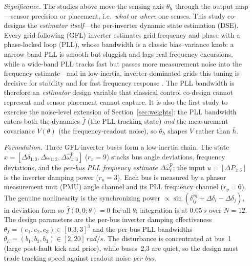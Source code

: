 \documentclass[twocolumn,amsthm]{autart}
\begin{document}
\emph{Significance.} The studies above move the sensing axis $\theta_h$ through
the output map---sensor precision or placement, i.e.\ \emph{what} or \emph{where}
one senses. This study co-designs the \emph{estimator itself}---the per-inverter
dynamic state estimation (DSE). Every
grid-following (GFL) inverter estimates grid frequency and phase with a
phase-locked loop (PLL), whose bandwidth is a classic bias--variance knob: a
narrow-band PLL is smooth but sluggish and lags real frequency excursions, while
a wide-band PLL tracks fast but passes more measurement noise into the frequency
estimate---and in low-inertia, inverter-dominated grids this tuning is decisive
for stability and for fast frequency response \cite{zhao2019power}. The PLL
bandwidth is therefore an \emph{estimator} design variable that classical control
co-design cannot represent and sensor placement cannot capture. It is also the
first study to exercise the noise-level extension of
Section~\ref{sec:weights}: the PLL bandwidth enters both the dynamics
$\bar f$ (the PLL tracking state) \emph{and} the measurement covariance
$V(\theta)$ (the frequency-readout noise), so $\theta_h$ shapes $V$ rather than
$\bar h$.

\emph{Formulation.} Three GFL-inverter buses form a low-inertia chain. The state
$x=[\Delta\delta_{1:3},\Delta\omega_{1:3},\Delta\hat\omega^{\mathrm p}_{1:3}]$
($r_x=9$) stacks bus angle deviations, frequency deviations, and the
\emph{per-bus PLL frequency estimate} $\Delta\hat\omega^{\mathrm p}_i$; the input
$u=[\Delta P_{1:3}]$ is the inverter damping power ($r_u=3$). Each bus is measured
by a phasor measurement unit (PMU) angle channel and its PLL frequency channel
($r_y=6$). The genuine
nonlinearity is the synchronizing power $\propto\sin(\delta^{\mathrm{eq}}_{ij}+
\Delta\delta_i-\Delta\delta_j)$, in deviation form so $\bar f(0,0;\theta)=0$ for
all $\theta$; integration is at $\SI{0.05}{s}$ over $N=12$. The design parameters
are the per-bus inverter damping effectiveness
$\theta_f=(e_1,e_2,e_3)\in[0.3,3]^3$ and the per-bus PLL bandwidths
$\theta_h=(b_1,b_2,b_3)\in[2,20]\,\si{rad/s}$. The disturbance is concentrated at
bus~1 (large post-fault kick and prior), while buses~2,3 are quiet, so the design
must trade tracking speed against readout noise \emph{per bus}.
\end{document}
